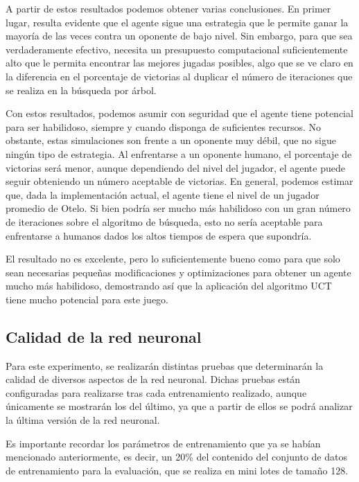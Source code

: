 \documentclass[conference,a4paper]{IEEEtran}
\begin{document}
A partir de estos resultados podemos obtener varias conclusiones. En primer lugar, resulta evidente que el agente sigue una estrategia que le permite ganar la mayoría 
de las veces contra un oponente de bajo nivel. Sin embargo, para que sea verdaderamente efectivo, necesita un presupuesto computacional suficientemente alto 
que le permita encontrar las mejores jugadas posibles, algo que se ve claro en la diferencia en el porcentaje de victorias al duplicar el número de iteraciones 
que se realiza en la búsqueda por árbol. 

Con estos resultados, podemos asumir con seguridad que el agente tiene potencial para ser habilidoso, siempre y cuando disponga de suficientes recursos. 
No obstante, estas simulaciones son frente a un oponente muy débil, que no sigue ningún tipo de estrategia. Al enfrentarse a un oponente humano, 
el porcentaje de victorias será menor, aunque dependiendo del nivel del jugador, el agente puede seguir obteniendo un número aceptable de victorias. 
En general, podemos estimar que, dada la implementación actual, el agente tiene el nivel de un jugador promedio de Otelo. Si bien podría ser mucho más habilidoso 
con un gran número de iteraciones sobre el algoritmo de búsqueda, esto no sería aceptable para enfrentarse a humanos dados los altos tiempos de espera que supondría.

El resultado no es excelente, pero lo suficientemente bueno como para que solo sean necesarias pequeñas modificaciones y optimizaciones 
para obtener un agente mucho más habilidoso, demostrando así que la aplicación del algoritmo UCT tiene mucho potencial para este juego.

\subsection{Calidad de la red neuronal}

Para este experimento, se realizarán distintas pruebas que determinarán la calidad de diversos aspectos de la red neuronal. 
Dichas pruebas están configuradas para realizarse tras cada entrenamiento realizado, aunque únicamente se mostrarán los del último, 
ya que a partir de ellos se podrá analizar la última versión de la red neuronal.

Es importante recordar los parámetros de entrenamiento que ya se habían mencionado anteriormente, es decir, un 20\% 
del contenido del conjunto de datos de entrenamiento para la evaluación, que se realiza en mini lotes de tamaño 128.
\end{document}
